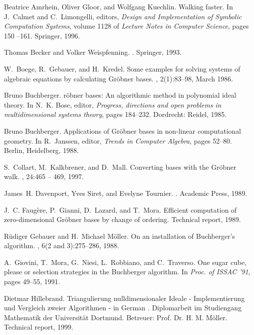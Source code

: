 \begin{thebibliography}{999}
Beatrice Amrhein, Oliver Gloor, and Wolfgang Kuechlin.
\newblock Walking faster.
\newblock In J.~Calmet and C.~Limongelli, editors, {\em Design and
  Implementation of Symbolic Computation Systems}, volume 1128 of {\em Lecture
  Notes in Computer Science}, pages 150 --161. Springer, 1996.

Thomas Becker and Volker Weispfenning.
.
\newblock Springer, 1993.

W.~Boege, R.~Gebauer, and H.~Kredel.
\newblock Some examples for solving systems of algebraic equations by
  calculating {G}r{\"o}bner bases.
, 2(1):83--98, March 1986.

Bruno Buchberger.
r{\"o}bner bases: An algorithmic method in polynomial ideal
  theory.
\newblock In N.~K. Bose, editor, {\em Progress, directions and open problems in
  multidimensional systems theory}, pages 184--232. Dordrecht: Reidel, 1985.

Bruno Buchberger.
\newblock Applications of {G}r{\"o}bner bases in non-linear computational
  geometry.
\newblock In R.~Janssen, editor, {\em Trends in Computer Algebra}, pages
  52--80. Berlin, Heidelberg, 1988.

S.~Collart, M.~Kalkbrener, and D.~Mall.
\newblock Converting bases with the {G}r\"obner walk.
, 24:465 -- 469, 1997.

James~H. Davenport, Yves Siret, and Evelyne Tournier.
.
\newblock Academic Press, 1989.

J.~C. Faug{\`e}re, P.~Gianni, D.~Lazard, and T.~Mora.
\newblock Efficient computation of zero-dimensional {G}r\"obner bases by change
  of ordering.
\newblock Technical report, 1989.

R{\"u}diger Gebauer and H.~Michael M{\"o}ller.
\newblock On an installation of {B}uchberger's algorithm.
, 6(2 and 3):275--286, 1988.

A.~Giovini, T.~Mora, G.~Niesi, L.~Robbiano, and C.~Traverso.
\newblock One sugar cube, please or selection strategies in the {B}uchberger
  algorithm.
\newblock In {\em Proc. of {ISSAC} '91}, pages 49--55, 1991.

Dietmar Hillebrand.
\newblock Triangulierung nulldimensionaler {I}deale - {I}mplementierung und
  {V}ergleich zweier {A}lgorithmen - in {G}erman . {D}iplomarbeit im
  {S}tudiengang {M}athematik der {U}niversit{\"a}t {D}ortmund. {B}etreuer:
  Prof. {D}r. {H}. {M}. {M}{\"o}ller.
\newblock Technical report, 1999.


\end{thebibliography}
